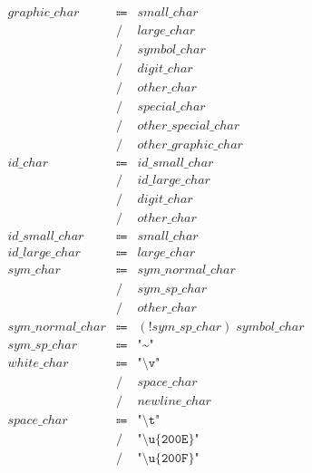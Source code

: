 \begin{align*}
    \begin{array}{rcll}
        \mathit{graphic\_char}
        &\Coloneq &\mathit{small\_char} \\
        &\mathrel{/} &\mathit{large\_char} \\
        &\mathrel{/} &\mathit{symbol\_char} \\
        &\mathrel{/} &\mathit{digit\_char} \\
        &\mathrel{/} &\mathit{other\_char} \\
        &\mathrel{/} &\mathit{special\_char} \\
        &\mathrel{/} &\mathit{other\_special\_char} \\
        &\mathrel{/} &\mathit{other\_graphic\_char} \\
        \mathit{id\_char}
        &\Coloneq &\mathit{id\_small\_char} \\
        &\mathrel{/} &\mathit{id\_large\_char} \\
        &\mathrel{/} &\mathit{digit\_char} \\
        &\mathrel{/} &\mathit{other\_char} \\
        \mathit{id\_small\_char}
        &\Coloneq &\mathit{small\_char} \\
        \mathit{id\_large\_char}
        &\Coloneq &\mathit{large\_char} \\
        \mathit{sym\_char}
        &\Coloneq &\mathit{sym\_normal\_char} \\
        &\mathrel{/} &\mathit{sym\_sp\_char} \\
        &\mathrel{/} &\mathit{other\_char} \\
        \mathit{sym\_normal\_char}
        &\Coloneq &(\mathop{!} \mathit{sym\_sp\_char})\; \mathit{symbol\_char} \\
        \mathit{sym\_sp\_char}
        &\Coloneq &\texttt{"\textasciitilde"} \\
        \mathit{white\_char}
        &\Coloneq &\texttt{"\textbackslash v"} \\
        &\mathrel{/} &\mathit{space\_char} \\
        &\mathrel{/} &\mathit{newline\_char} \\
        \mathit{space\_char}
        &\Coloneq &\texttt{"\textbackslash t"} \\
        &\mathrel{/} &\texttt{"\textbackslash u\{200E\}"} \\
        &\mathrel{/} &\texttt{"\textbackslash u\{200F\}"} \\

\end{array}
\end{align*}
